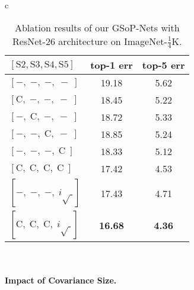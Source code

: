 \documentclass[10pt,twocolumn,letterpaper]{article}
\begin{document}
\begin{table}[htb!]
\begin{tabular}{c}
		\begin{minipage}{1\linewidth}
			\begin{subtable}{1\linewidth}
				\centering
				\footnotesize
				\setlength{\tabcolsep}{13pt}
				\begin{tabular}{l|c|c}
					\hline 
					$[\mathrm{S}2, \mathrm{S}3, \mathrm{S}4, \mathrm{S}5]$ & top-1 err & top-5 err  \\
					\hline
					$[-,\;-,\;-,\;-\;]$ & 19.18 & 5.62  \\
					$[\mathrm{C},\;-,\;-,\;-\;]$ & 18.45 & 5.22   \\
					$[-,\;\mathrm{C},\;-,\;-\;]$ & 18.72 & 5.33   \\
					$[-,\;-,\;\mathrm{C},\;-\;]$ & 18.85 & 5.24  \\
					$[-,\;-,\;-,\;\mathrm{C}\;]$ & 18.33 & 5.12   \\
					\hline
					$[\mathrm{C},\;\mathrm{C},\;\mathrm{C},\;\mathrm{C}\;]$ & 17.42 & 4.53   \\
					\hline
					$[-,\;-,\;-,\;i\sqrt{\;}]$ & 17.43 & 4.71   \\
					$[\mathrm{C},\;\mathrm{C},\;\mathrm{C},\;i\sqrt{\;}]$ & \textbf{16.68} & \textbf{4.36}   \\
					\hline
				\end{tabular}%
				\setlength{\abovecaptionskip}{1.5pt}
				\setlength{\belowcaptionskip}{4pt}
				\caption{Single block performance. }\label{subtab:stage_comparison}
			\end{subtable}%
		\end{minipage}\\
	\end{tabular}
	\caption{Ablation results of our GSoP-Nets with ResNet-26 architecture on ImageNet-$\frac{1}{4}$K.}
	\label{tab:ablation_results}
\end{table} 


\vspace{-10pt}\paragraph{Impact of Covariance Size.}
\end{document}
